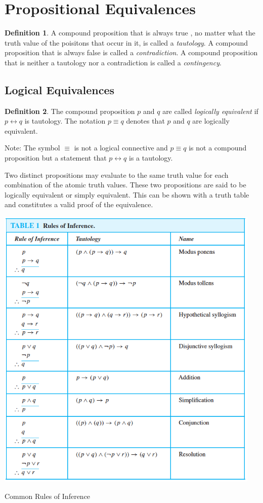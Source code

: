 \documentclass[11pt]{book} %
\theoremstyle {definition}
\newtheorem {definition}{Definition}[section]
\theoremstyle {remark}
\begin{document}
\section {Propositional Equivalences}

\begin {definition}
A compound proposition that is always true , no matter what the truth value of the poisitons that occur in it, is called a \textit{tautology}. A compound proposition that is always false is called a \textit{contradiction}. A compound proposition that is neither a tautology nor a contradiction is called a \textit{contingency}.
\end {definition}

    \subsection {Logical Equivalences}
\begin {definition}
The compound proposition $p$ and $q$ are called \textit{logically equivalent} if $p \leftrightarrow q$ is  tautology. The notation $p \equiv q$ denotes that $p$ and $q$ are logically equivalent.
\end {definition}

Note: The symbol $\equiv$ is not a logical connective and $p \equiv q$ is not a compound proposition but a statement that $p \leftrightarrow q$ is a tautology. 

Two distinct propositions may evaluate to the same truth value for each combination of the atomic truth values. These two propositions are said to be logically equivalent or simply equivalent. This can be shown with a truth table and constitutes a valid proof of the equivalence.

\begin{table}[htbp]
   \centering
   \includegraphics [width=5in] {Table-1-6-1-RulesOfInference}
   \caption{Common Rules of Inference}
   \label{table:rulesofinference}
\end{table}
\end{document}
